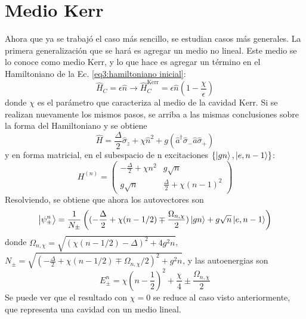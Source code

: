 \section{Medio Kerr}\label{sec3:medio kerr}
Ahora que ya se trabajó el caso más sencillo, se estudian casos más generales. La primera generalización que se hará es agregar un medio no lineal. Este medio se lo conoce como medio Kerr, y lo que hace es agregar un término en el Hamiltoniano de la Ec. \ref{eq3:hamiltoniano inicial}:
\begin{equation}
    \hat H_C=\epsilon \hat n \rightarrow \hat H_C^{\text{Kerr}}=\epsilon \hat n (1-\frac{\chi}{\epsilon})
\end{equation}
donde $\chi$ es el parámetro que caracteriza al medio de la cavidad Kerr. Si se realizan nuevamente los mismos pasos, se arriba a las mismas conclusiones sobre la forma del Hamiltoniano y se obtiene
\begin{equation}
    \hat H=\frac{\Delta}{2}\hat \sigma_z+\chi \hat n^2+g(\hat a^\dagger \hat \sigma_-\hat a \hat \sigma_+)
\end{equation}
y en forma matricial, en el subespacio de n excitaciones $\{\ket{gn},\ket{e,n-1}\}$:
\begin{equation}
    H^{(n)} = \begin{pmatrix}
        -\frac{\Delta}{2}+\chi n^2 & g \sqrt{n} \\
        g \sqrt{n} & \frac{\Delta}{2}+\chi (n-1)^2 
    \end{pmatrix}
\end{equation}
Resolviendo, se obtiene que ahora los autovectores son
\begin{equation}
    \ket{\psi_\pm^n}=\frac{1}{N_\pm} \left( (-\frac{\Delta}{2}+\chi(n-1/2)\mp\frac{\Omega_{n,\chi}}{2}) \ket{gn} + g\sqrt{n} \ket{e,n-1}  \right)
\end{equation}
donde $\Omega_{n,\chi}=\sqrt{(\chi(n-1/2)-\Delta)^2+4g^2n}$, $N_\pm=\sqrt{(-\frac{\Delta}{2}+\chi(n-1/2)\mp\Omega_{n,\chi}/2)^2+g^2n}$, y las autoenergias son 
\begin{equation}\label{eq3:autoenergia kerr}
    E_\pm^n=\chi(n-\frac{1}{2})^2 +\frac{\chi}{4} \pm \frac{\Omega_{n,\chi}}{2}
\end{equation}
Se puede ver que el resultado con $\chi=0$ se reduce al caso visto anteriormente, que representa una cavidad con un medio lineal.

